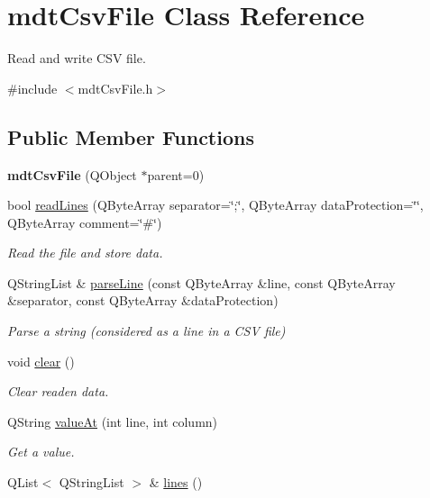 \hypertarget{classmdt_csv_file}{
\section{mdtCsvFile Class Reference}
\label{classmdt_csv_file}
}


Read and write CSV file.  




{\ttfamily \#include $<$mdtCsvFile.h$>$}

\subsection*{Public Member Functions}
\begin{DoxyCompactItemize}
\item 
\hypertarget{classmdt_csv_file_afabe0f84461413af8defaccd615886b5}{
{\bfseries mdtCsvFile} (QObject $\ast$parent=0)}
\label{classmdt_csv_file_afabe0f84461413af8defaccd615886b5}

\item 
bool \hyperlink{classmdt_csv_file_ab2d9754e50db179825813081bb129797}{readLines} (QByteArray separator=\char`\"{};\char`\"{}, QByteArray dataProtection=\char`\"{}\char`\"{}, QByteArray comment=\char`\"{}\#\char`\"{})
\begin{DoxyCompactList}\small\item\em Read the file and store data. \end{DoxyCompactList}\item 
QStringList \& \hyperlink{classmdt_csv_file_af44de864675351a6f22b176e64a4cecc}{parseLine} (const QByteArray \&line, const QByteArray \&separator, const QByteArray \&dataProtection)
\begin{DoxyCompactList}\small\item\em Parse a string (considered as a line in a CSV file) \end{DoxyCompactList}\item 
\hypertarget{classmdt_csv_file_afe815d4fbdc08c442c9b1dce447cda75}{
void \hyperlink{classmdt_csv_file_afe815d4fbdc08c442c9b1dce447cda75}{clear} ()}
\label{classmdt_csv_file_afe815d4fbdc08c442c9b1dce447cda75}

\begin{DoxyCompactList}\small\item\em Clear readen data. \end{DoxyCompactList}\item 
QString \hyperlink{classmdt_csv_file_af2d0917f92dd0d0d8100edccf1d3e4ee}{valueAt} (int line, int column)
\begin{DoxyCompactList}\small\item\em Get a value. \end{DoxyCompactList}\item 
\hypertarget{classmdt_csv_file_a089e82f55982a40587f3d9e53c7ff261}{
QList$<$ QStringList $>$ \& \hyperlink{classmdt_csv_file_a089e82f55982a40587f3d9e53c7ff261}{lines} ()}
\label{classmdt_csv_file_a089e82f55982a40587f3d9e53c7ff261}


\end{DoxyCompactItemize}
